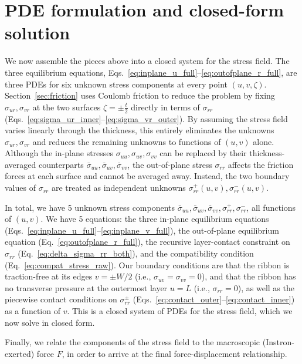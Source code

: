 \documentclass[11pt]{article}
\begin{document}
\section{PDE formulation and closed-form solution}\label{sec:closed_form}
We now assemble the pieces above into a closed system for the stress field. The three equilibrium equations, Eqs.~\eqref{eq:inplane_u_full}--\eqref{eq:outofplane_r_full}, are three PDEs for six unknown stress components at every point $(u,v,\zeta)$. 
Section~\ref{sec:friction} uses Coulomb friction to reduce the problem by fixing $\sigma_{ur},\sigma_{vr}$ at the two surfaces $\zeta=\pm\frac{t}{2}$ directly in terms of $\sigma_{rr}$ (Eqs.~\ref{eq:sigma_ur_inner}--\ref{eq:sigma_vr_outer}). By assuming the stress field varies linearly through the thickness, this entirely eliminates the unknowns $\sigma_{ur},\sigma_{vr}$ and reduces the remaining unknowns to functions of $(u,v)$ alone. Although the in-plane stresses $\sigma_{uu},\sigma_{uv},\sigma_{vv}$ can be replaced by their thickness-averaged counterparts $\bar\sigma_{uu},\bar\sigma_{uv},\bar\sigma_{vv}$, the out-of-plane stress $\sigma_{rr}$ affects the friction forces at each surface and cannot be averaged away. Instead, the two boundary values of $\sigma_{rr}$ are treated as independent unknowns $\sigma_{rr}^+(u,v),\sigma_{rr}^-(u,v)$.

In total, we have 5 unknown stress components $\bar\sigma_{uu},\bar\sigma_{uv},\bar\sigma_{vv},\sigma_{rr}^+,\sigma_{rr}^-$, all functions of $(u,v)$. We have 5 equations: the three in-plane equilibrium equations (Eqs.~\ref{eq:inplane_u_full}--\ref{eq:inplane_v_full}), the out-of-plane equilibrium equation (Eq.~\ref{eq:outofplane_r_full}), the recursive layer-contact constraint on $\sigma_{rr}$ (Eq.~\ref{eq:delta_sigma_rr_both}), and the compatibility condition (Eq.~\ref{eq:compat_stress_raw}). Our boundary conditions are that the ribbon is traction-free at its edges $v=\pm W/2$ (i.e., $\sigma_{uv}=\sigma_{vv}=0$), and that the ribbon has no transverse pressure at the outermost layer $u=L$ (i.e., $\sigma_{rr}=0$), as well as the piecewise contact conditions on $\sigma_{rr}^\pm$ (Eqs.~\ref{eq:contact_outer}--\ref{eq:contact_inner}) as a function of $v$. This is a closed system of PDEs for the stress field, which we now solve in closed form.

Finally, we relate the components of the stress field to the macroscopic (Instron-exerted) force $F$, in order to arrive at the final force-displacement relationship.
\end{document}
